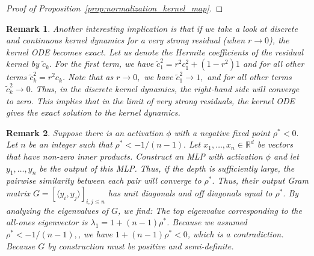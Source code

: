 \documentclass[twoside]{article}
\newcommand{\E}{\mathbb{E}\,}
\newcommand{\R}{\mathbb{R}}
\newtheorem{remark}{Remark}
\theoremstyle{definition}
\begin{document}
\begin{proof}[Proof of Proposition~\ref{prop:normalization_kernel_map}]
\end{proof}

\begin{remark}\label{rem:residual_ODE}
    Another interesting implication is that if we take a look at discrete and continuous kernel dynamics for a very strong residual (when $r\to 0$), the kernel ODE becomes exact. Let us denote the Hermite coefficients of the residual kernel by $\tilde{c}_k.$ For the first term, we have $\tilde{c}_1^2 = r^2 c_1^2 + (1-r^2) 1$ and for all other terms $\tilde{c}_k^2 = r^2 c_k$. Note that as $r \to 0,$ we have $\tilde{c}_1^2\to 1,$ and for all other terms $\tilde{c}_k^2\to 0.$ Thus, in the discrete kernel dynamics, the right-hand side will converge to zero. This implies that in the limit of very strong residuals, the kernel ODE gives the exact solution to the kernel dynamics. 
\end{remark}

\begin{remark}\label{rem:no_negative_geometric}
    Suppose there is an activation $\phi$ with a negative fixed point $\rho^*<0.$ Let $n$ be an integer such that $\rho^* < -1/(n-1).$ Let $x_1,\dots, x_n\in \R^d$ be vectors that have non-zero inner products. Construct an MLP with activation $\phi$ and let $y_1,\dots, y_n$ be the output of this MLP. Thus, if the depth is sufficiently large, the pairwise similarity between each pair will converge to $\rho^*.$ Thus, their output Gram matrix $G = [\langle y_i,y_j\rangle]_{i,j\le n}$  has unit diagonals and off diagonals equal to $\rho^*.$ By analyzing the eigenvalues of $G$, we find: The top eigenvalue corresponding to the all-ones eigenvector is $\lambda_1 = 1 + (n-1)\rho^*$. Because we assumed $\rho^* < -1/(n-1),$, we have $1 + (n-1)\rho^* < 0$, which is a contradiction. Because $G$ by construction must be positive and semi-definite.  
\end{remark}
\end{document}
